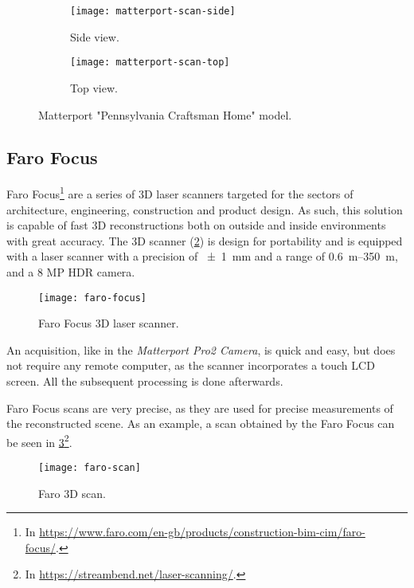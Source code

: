 \begin{figure}[h]
    
    \centering
    \begin{subfigure}{\textwidth}
        \centering
        \texttt{[image: matterport-scan-side]}
        \caption{Side view.}
    \end{subfigure}

    \begin{subfigure}{\textwidth}
        \centering
        \texttt{[image: matterport-scan-top]}
        \caption{Top view.}
    \end{subfigure}

    \caption{Matterport "Pennsylvania Craftsman Home" model.}
    \label{fig:matterport-model}
\end{figure}

\subsection{Faro Focus}

Faro Focus\footnote{In \url{https://www.faro.com/en-gb/products/construction-bim-cim/faro-focus/}.} are a series of 3D laser scanners targeted for the sectors of architecture, engineering, construction and product design. As such, this solution is capable of fast 3D reconstructions both on outside and inside environments with great accuracy. The 3D scanner (\cref{fig:faro-focus}) is design for portability and is equipped with a laser scanner with a precision of \SI{+-1}{\milli\meter} and a range of \SIrange{0.6}{350}{\meter}, and a 8 MP HDR camera.

\begin{figure}[h]
    \centering
    \texttt{[image: faro-focus]}
    \caption{Faro Focus 3D laser scanner.}
    \label{fig:faro-focus}
\end{figure}

An acquisition, like in the \emph{Matterport Pro2 Camera}, is quick and easy, but does not require any remote computer, as the scanner incorporates a touch LCD screen. All the subsequent processing is done afterwards.

Faro Focus scans are very precise, as they are used for precise measurements of the reconstructed scene. As an example, a scan obtained by the Faro Focus can be seen in \cref{fig:faro-scan}\footnote{In \url{https://streambend.net/laser-scanning/}.}.

\begin{figure}[h]
    \centering
    \texttt{[image: faro-scan]}
    \caption{Faro 3D scan.}
    \label{fig:faro-scan}
    
\end{figure}

